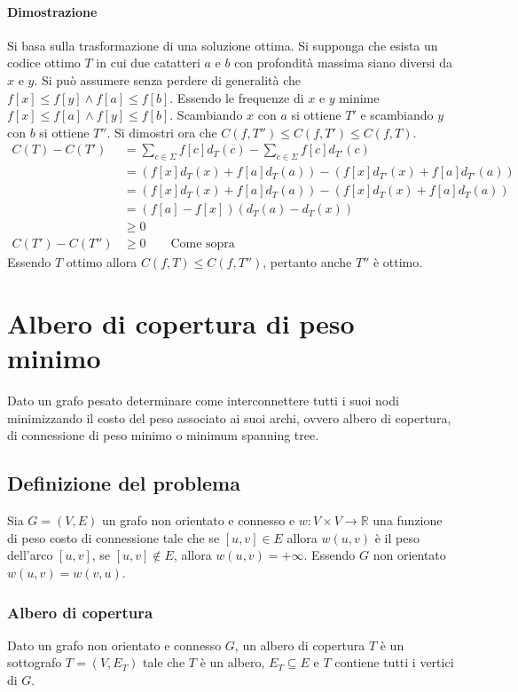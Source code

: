 	\paragraph{Dimostrazione}
	Si basa sulla trasformazione di una soluzione ottima. Si supponga che esista un codice ottimo $T$ in cui due catatteri $a$ e $b$ con profondit\`a massima siano diversi da $x$ e $y$. 
	Si pu\`o assumere senza perdere di generalit\`a che $f[x]\le f[y]\land f[a]\le f[b]$. Essendo le frequenze di $x$ e $y$ minime $f[x]\le f[a]\land f[y]\le f[b]$. Scambiando $x$ con $a$
	si ottiene $T'$ e scambiando $y$ con $b$ si ottiene $T''$. Si dimostri ora che $C(f, T'')\le C(f, T')\le C(f, T)$.
	\begin{align*}
		C(T) - C(T') & = \sum\limits_{c\in \Sigma}f[c]d_T(c) - \sum\limits_{c\in\Sigma}f[c]d_{T'}(c)\\
		             & = (f[x]d_T(x)+f[a]d_T(a)) - (f[x]d_{T'}(x) + f[a]d_{T'}(a))\\
			     & = (f[x]d_T(x)+f[a]d_T(a)) - (f[x]d_{T}(x) + f[a]d_{T}(a))\\
			     & = (f[a] - f[x])(d_T(a) - d_T(x))\\
			     & \ge 0\\
		C(T') - C(T'') & \ge 0\quad\quad \text{Come sopra}
	\end{align*}
	Essendo $T$ ottimo allora $C(f, T)\le C(f, T'')$, pertanto anche $T''$ \`e ottimo.
	\section{Albero di copertura di peso minimo}
	Dato un grafo pesato determinare come interconnettere tutti i suoi nodi minimizzando il costo del peso associato ai suoi archi, ovvero albero di copertura, di connessione di peso minimo
	o minimum spanning tree.
	\subsection{Definizione del problema}
	Sia $G=(V, E)$ un grafo non orientato e connesso e $w:V\times V\rightarrow\mathbb{R}$ una funzione di peso costo di connessione tale che se $[u, v]\in E$ allora $w(u, v)$ \`e il peso 
	dell'arco $[u, v]$, se $[u, v]\not\in E$, allora $w(u, v)= + \infty$. Essendo $G$ non orientato $w(u, v) = w(v, u)$.
	\subsubsection{Albero di copertura}
	Dato un grafo non orientato e connesso $G$, un albero di copertura $T$ \`e un sottografo $T=(V, E_T)$ tale che $T$ \`e un albero, $E_T\subseteq E$ e $T$ contiene tutti i vertici di $G$. 
